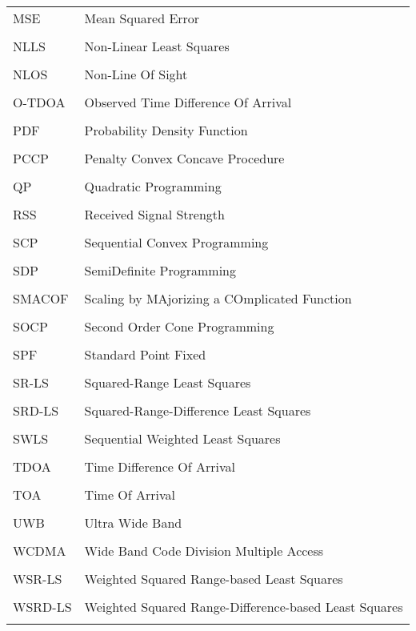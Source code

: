 \begin{longtable}[h]{l l}
\\
MSE & Mean Squared Error\\
\\
NLLS & Non-Linear Least Squares \\
\\
NLOS & Non-Line Of Sight \\
\\
O-TDOA & Observed Time Difference Of Arrival\\
\\
PDF & Probability Density Function \\
\\
PCCP & Penalty Convex Concave Procedure \\
\\
QP & Quadratic Programming \\
\\
RSS & Received Signal Strength \\
\\
SCP & Sequential Convex Programming \\
\\
SDP & SemiDefinite Programming \\
\\
SMACOF & Scaling by MAjorizing a COmplicated Function \\
\\
SOCP & Second Order Cone Programming \\
\\
SPF & Standard  Point Fixed\\
\\
SR-LS  & Squared-Range Least Squares \\
\\
SRD-LS & Squared-Range-Difference Least Squares \\
\\
SWLS & Sequential Weighted Least Squares \\
\\
TDOA &  Time Difference Of Arrival \\
\\
TOA & Time Of Arrival \\
\\
UWB & Ultra Wide Band \\
\\
WCDMA & Wide Band Code Division Multiple Access \\
\\
WSR-LS & Weighted Squared Range-based Least Squares \\
\\
WSRD-LS & Weighted Squared Range-Difference-based Least Squares \\
\\
\end{longtable}

